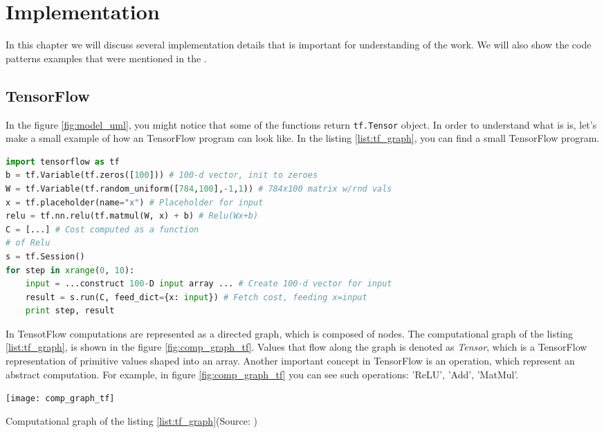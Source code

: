 \chapter{Implementation}
\label{ch:implementation}
In this chapter we will discuss several implementation details that
is important for understanding of the work. We will also show
the code patterns examples that were mentioned in the .

\section{TensorFlow}
In the figure \ref{fig:model_uml}, you might notice that some of the functions
return \lstinline{tf.Tensor} object. In order to understand what is is,
let's make a small example of how an TensorFlow program can look like.
In the listing \ref{list:tf_graph}, you can find a small TensorFlow program.



\begin{lstlisting}[language=Python, caption={TensorFlow example \cite{tensorflow2015-whitepaper}},label={list:tf_graph}]
import tensorflow as tf
b = tf.Variable(tf.zeros([100])) # 100-d vector, init to zeroes
W = tf.Variable(tf.random_uniform([784,100],-1,1)) # 784x100 matrix w/rnd vals
x = tf.placeholder(name="x") # Placeholder for input
relu = tf.nn.relu(tf.matmul(W, x) + b) # Relu(Wx+b)
C = [...] # Cost computed as a function
# of Relu
s = tf.Session()
for step in xrange(0, 10):
	input = ...construct 100-D input array ... # Create 100-d vector for input
	result = s.run(C, feed_dict={x: input}) # Fetch cost, feeding x=input
	print step, result
\end{lstlisting}


In TensotFlow computations are represented as a directed graph, which is composed
of nodes. The computational graph of the listing \ref{list:tf_graph}, is shown
in the figure \ref{fig:comp_graph_tf}. Values that flow along the graph is denoted
as \emph{Tensor}, which is a TensorFlow representation of primitive values shaped
into an array. Another important concept in TensorFlow is an operation, which represent
an abstract computation. For example, in figure \ref{fig:comp_graph_tf} you can see
such operations: 'ReLU', 'Add', 'MatMul'.


\begin{center}
	\texttt{[image: comp\_graph\_tf]}
	\caption{Computational graph of the listing \ref{list:tf_graph}(Source: \cite{tensorflow2015-whitepaper})}
	\label{fig:comp_graph_tf}
\end{center}


